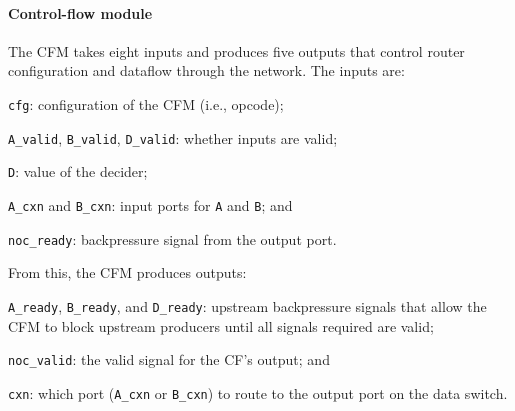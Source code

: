 \paragraph{Control-flow module}
%
The CFM takes eight inputs and produces five outputs that control router
configuration and dataflow through the network.
% 
The inputs are:
\begin{compactitem}

\item {\tt cfg}: configuration of the CFM (i.e., opcode);

\item {\tt A\_valid}, {\tt B\_valid}, {\tt D\_valid}: whether inputs are valid;

\item {\tt D}: value of the decider;

\item {\tt A\_cxn} and {\tt B\_cxn}: input ports for {\tt A} and {\tt B}; and

\item {\tt noc\_ready}: backpressure signal from the output port.
  
\end{compactitem}
%
From this, the CFM produces outputs:
\begin{compactitem}
  
\item {\tt A\_ready}, {\tt B\_ready}, and {\tt D\_ready}: upstream
  backpressure signals that allow the CFM to block upstream
  producers until all signals required are valid;

\item {\tt noc\_valid}: the valid signal for the CF's output; and

\item {\tt cxn}: which port ({\tt A\_cxn} or {\tt B\_cxn}) to route
  to the output port on the data switch.
  
\end{compactitem}

